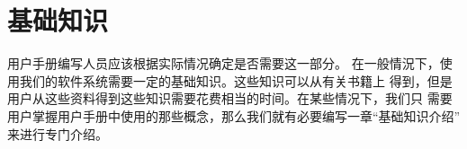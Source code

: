 \chapter{基础知识}
用户手册编写人员应该根据实际情况确定是否需要这一部分。
在一般情況下，使用我们的软件系统需要一定的基础知识。这些知识可以从有关书籍上
得到，但是用户从这些资料得到这些知识需要花费相当的时间。在某些情况下，我们只
需要用户掌握用户手册中使用的那些概念，那么我们就有必要编写一章“基础知识介绍”
来进行专门介绍。